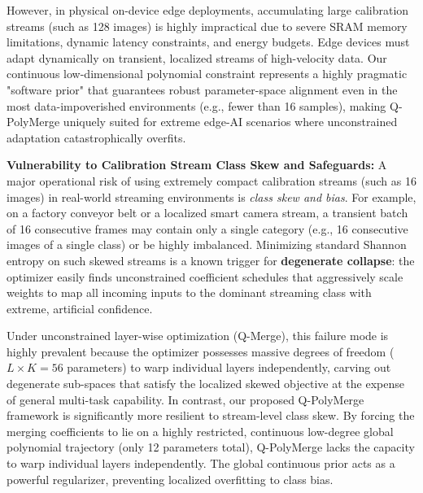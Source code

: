 However, in physical on-device edge deployments, accumulating large calibration streams (such as 128 images) is highly impractical due to severe SRAM memory limitations, dynamic latency constraints, and energy budgets. Edge devices must adapt dynamically on transient, localized streams of high-velocity data. Our continuous low-dimensional polynomial constraint represents a highly pragmatic "software prior" that guarantees robust parameter-space alignment even in the most data-impoverished environments (e.g., fewer than 16 samples), making Q-PolyMerge uniquely suited for extreme edge-AI scenarios where unconstrained adaptation catastrophically overfits.

\textbf{Vulnerability to Calibration Stream Class Skew and Safeguards:} A major operational risk of using extremely compact calibration streams (such as 16 images) in real-world streaming environments is \emph{class skew and bias}. For example, on a factory conveyor belt or a localized smart camera stream, a transient batch of 16 consecutive frames may contain only a single category (e.g., 16 consecutive images of a single class) or be highly imbalanced. Minimizing standard Shannon entropy on such skewed streams is a known trigger for \textbf{degenerate collapse}: the optimizer easily finds unconstrained coefficient schedules that aggressively scale weights to map all incoming inputs to the dominant streaming class with extreme, artificial confidence.

Under unconstrained layer-wise optimization (Q-Merge), this failure mode is highly prevalent because the optimizer possesses massive degrees of freedom ($L \times K = 56$ parameters) to warp individual layers independently, carving out degenerate sub-spaces that satisfy the localized skewed objective at the expense of general multi-task capability. In contrast, our proposed Q-PolyMerge framework is significantly more resilient to stream-level class skew. By forcing the merging coefficients to lie on a highly restricted, continuous low-degree global polynomial trajectory (only 12 parameters total), Q-PolyMerge lacks the capacity to warp individual layers independently. The global continuous prior acts as a powerful regularizer, preventing localized overfitting to class bias.

